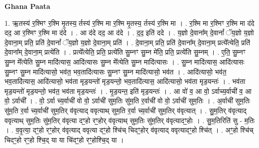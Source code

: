 \documentclass[17pt]{extarticle}
\begin{document}
\textbf{Ghana Paata } \newline

1. ऋ॒तस्य॑ र॒श्मिꣳ र॒श्मि मृ॒तस्य॒ र्तस्य॑ र॒श्मि मा र॒श्मि मृ॒तस्य॒ र्तस्य॑ र॒श्मि मा । . र॒श्मि मा र॒श्मिꣳ र॒श्मि मा द॑दे दद॒ आ र॒श्मिꣳ र॒श्मि मा द॑दे । . आ द॑दे दद॒ आ द॑दे । . द॒द॒ इति॑ ददे । . य॒ज्ञो दे॒वाना᳚म् दे॒वानां᳚ ॅय॒ज्ञो य॒ज्ञो दे॒वाना॒म् प्रति॒ प्रति॑ दे॒वानां᳚ ॅय॒ज्ञो य॒ज्ञो दे॒वाना॒म् प्रति॑ । . दे॒वाना॒म् प्रति॒ प्रति॑ दे॒वाना᳚म् दे॒वाना॒म् प्रत्ये᳚त्येति॒ प्रति॑ दे॒वाना᳚म् दे॒वाना॒म् प्रत्ये॑ति । . प्रत्ये᳚त्येति॒ प्रति॒ प्रत्ये॑ति सु॒म्नꣳ सु॒म्न मे॑ति॒ प्रति॒ प्रत्ये॑ति सु॒म्नम् । . ए॒ति॒ सु॒म्नꣳ सु॒म्न मे᳚त्येति सु॒म्न मादि॑त्यास॒ आदि॑त्यासः सु॒म्न मे᳚त्येति सु॒म्न मादि॑त्यासः । . सु॒म्न मादि॑त्यास॒ आदि॑त्यासः सु॒म्नꣳ सु॒म्न मादि॑त्यासो॒ भव॑त॒ भव॒तादि॑त्यासः सु॒म्नꣳ सु॒म्न मादि॑त्यासो॒ भव॑त । . आदि॑त्यासो॒ भव॑त॒ भव॒तादि॑त्यास॒ आदि॑त्यासो॒ भव॑ता मृड॒यन्तो॑ मृड॒यन्तो॒ भव॒तादि॑त्यास॒ आदि॑त्यासो॒ भव॑ता मृड॒यन्तः॑ । . भव॑ता मृड॒यन्तो॑ मृड॒यन्तो॒ भव॑त॒ भव॑ता मृड॒यन्तः॑ । . मृ॒ड॒यन्त॒ इति॑ मृड॒यन्तः॑ । . आ वो॑ व॒ आ वो॒ ऽर्वाच्य॒र्वाची॑ व॒ आ वो॒ ऽर्वाची᳚ । . वो॒ ऽर्वा च्य॒र्वाची॑ वो वो॒ ऽर्वाची॑ सुम॒तिः सु॑म॒ति र॒र्वाची॑ वो वो॒ ऽर्वाची॑ सुम॒तिः । . अ॒र्वाची॑ सुम॒तिः सु॑म॒ति र॒र्वा च्य॒र्वाची॑ सुम॒तिर् व॑वृत्याद् ववृत्याथ् सुम॒ति र॒र्वा च्य॒र्वाची॑ सुम॒तिर् व॑वृत्यात् । . सु॒म॒तिर् व॑वृत्याद् ववृत्याथ् सुम॒तिः सु॑म॒तिर् व॑वृत्या दꣳ॒॒हो रꣳ॒॒होर् व॑वृत्याथ् सुम॒तिः सु॑म॒तिर् व॑वृत्यादꣳ॒॒होः । . सु॒म॒तिरिति॑ सु - म॒तिः । . व॒वृ॒त्या॒ दꣳ॒॒हो रꣳ॒॒होर् व॑वृत्याद् ववृत्या दꣳ॒॒हो श्चि॑च् चिदꣳ॒॒होर् व॑वृत्याद् ववृत्यादꣳ॒॒हो श्चि॑त् । . अꣳ॒॒हो श्चि॑च् चिदꣳ॒॒हो रꣳ॒॒हो श्चि॒द् या या चि॑दꣳ॒॒हो रꣳ॒॒होश्चि॒द् या । \newline
\end{document}
